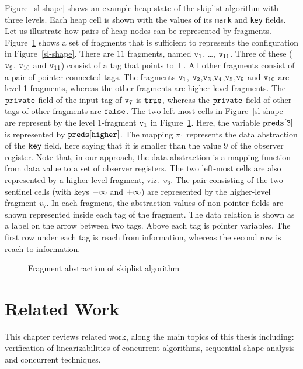 Figure~\ref{sl-shape} shows an example heap state of the
skiplist algorithm with three levels. Each heap cell is shown with the values of its {\tt mark} and {\tt key} fields. %
Let us illustrate how pairs of heap nodes can be represented by fragments.
Figure~\ref{fig:skiplistabs} shows a set of fragments that is sufficient to
represents the configuration in Figure~\ref{sl-shape}. There are $11$ fragments, named $\mathtt{v}_1$, \ldots , $\mathtt{v}_{11}$. Three of
these ($\mathtt{v}_9$, $\mathtt{v}_{10}$ and $\mathtt{v}_{11}$) consist of a tag that points to $\bot$. All other fragments consist of a pair of pointer-connected tags. The fragments $\mathtt{v}_1$, $\mathtt{v}_2$,$\mathtt{v}_3$,$\mathtt{v}_4$,$\mathtt{v}_5$,$\mathtt{v}_9$ and $\mathtt{v}_{10}$ are level-1-fragments, whereas the other fragments are higher level-fragments. The $\tt private$ field of the input tag of $\mathtt{v}_7$ is $\tt true$, whereas the $\tt private$ field of other tags of other fragments are $\tt false$. The two left-most cells
in Figure~\ref{sl-shape} are represent by the level 1-fragment $\mathtt{v}_1$ in
Figure~\ref{fig:skiplistabs}. Here, the variable $\tt preds[3]$ is represented by $\tt preds[higher]$. The mapping $\pi_1$ represents the data abstraction of the $\tt key$ field, here saying that it is smaller than the value $9$ of the observer register. Note that, in our approach, the data abstraction is a mapping function from data value to a set of observer registers.
The two left-most cells are also represented by
a higher-level fragment, viz.\ $v_6$.
The pair consisting of the two sentinel cells (with keys $\tt -\infty$ and $\tt +\infty$) are represented by the higher-level fragment $v_7$. In each fragment, the abstraction values of non-pointer fields are shown represented inside each tag of the fragment. The data relation is shown as a label on the  arrow between two tags. Above each tag is pointer variables. The first row under each tag is reach from information, whereas the second row is reach to information.
 \begin{figure}
\center
	
\caption{Fragment abstraction of skiplist algorithm}
\label{fig:skiplistabs}
\vspace*{-0.6cm}
\end{figure} 


\chapter{Related Work}
This chapter reviews related work, along the main topics of this thesis including: verification of linearizabilities of concurrent algorithms, 
sequential shape analysis and concurrent techniques.
